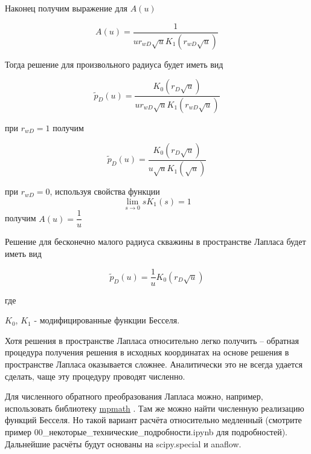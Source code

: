 Наконец получим выражение для $A(u)$

\begin{equation}  \label{eq:eq_12.21} 
	A(u)  = \dfrac {1}{u r_{wD}  \sqrt u  K_1(r_{wD} \sqrt u)}
\end{equation}

Тогда решение для произвольного радиуса будет иметь вид

\begin{equation}  \label{eq:eq_12.22} 
	\tilde{p}_D(u) = \frac{K_0 \left( r_D \sqrt u  \right)}{u r_{wD}  \sqrt u  K_1(r_{wD} \sqrt u)} 
\end{equation}

при $r_{wD} = 1 $ получим 

\begin{equation}  \label{eq:eq_12.23}
	 \tilde{p}_D(u) = \frac{K_0 \left( r_D \sqrt u  \right)}{u \sqrt u  K_1(\sqrt u)} 
\end{equation}


при $r_{wD} = 0 $, используя свойства функции $$\lim_{s \to 0} sK_1(s) = 1$$ получим  $A(u) = \dfrac{1}{u}$

Решение для бесконечно малого радиуса скважины в пространстве Лапласа будет иметь вид

\begin{equation}  \label{eq:eq_12.25}
	 \tilde{p}_D(u) = \frac{1}{u} K_0 \left( r_D \sqrt u  \right) 
\end{equation}

где 

$K_0$, $K_1$ - модифицированные функции Бесселя.

Хотя решения в пространстве Лапласа относительно легко получить -- обратная процедура получения решения в исходных координатах на основе решения в пространстве Лапласа оказывается сложнее. Аналитически это не всегда удается сделать, чаще эту процедуру проводят численно. 

Для численного обратного преобразования Лапласа можно, например, использовать библиотеку 
\href{href="https://mpmath.org/doc/current/calculus/inverselaplace.html}{mpmath} . Там же можно найти численную реализацию функций Бесселя. Но такой вариант расчёта относительно медленный (смотрите пример 00\_некоторые\_технические\_подробности.ipynb для подробностей). Дальнейшие расчёты будут основаны на scipy.special и anaflow. 


